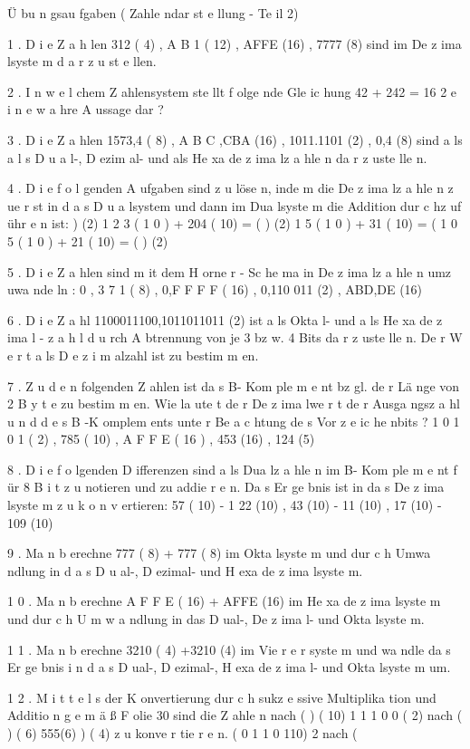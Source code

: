 Ü bu n gsau fgaben ( Zahle ndar st e llung - Te il 2)

1 . D i e Z a h len 312 ( 4) , A B 1 ( 12) , AFFE (16) , 7777 (8) sind im De z ima lsyste m
d a r z u st e llen.

2 . I n w e l chem Z ahlensystem ste llt f olge nde Gle ic hung 42 + 242 = 16 2
e i n e w a hre A ussage dar ?

3 . D i e Z a hlen 1573,4 ( 8) , A B C ,CBA (16) , 1011.1101 (2) , 0,4 (8) sind a ls
a l s D u a l-, D ezim al- und als He xa de z ima lz a hle n da r z uste lle n.

4 . D i e f o l genden A ufgaben sind z u löse n, inde m die De z ima lz a hle n z ue r st in
d a s D u a lsystem und dann im Dua lsyste m die Addition dur c hz uf ühr e n ist:
) (2)
1 2 3 ( 1 0 ) + 204 ( 10) = (
) (2)
1 5 ( 1 0 ) + 31 ( 10) = (
1 0 5 ( 1 0 ) + 21 ( 10) = (
) (2)

5 . D i e Z a hlen sind m it dem H orne r - Sc he ma in De z ima lz a hle n umz uwa nde ln :
0 , 3 7 1 ( 8) , 0,F F F F ( 16) , 0,110 011 (2) , ABD,DE (16)

6 . D i e Z a hl 1100011100,1011011011 (2) ist a ls Okta l- und a ls He xa de z ima l -
z a h l d u rch A btrennung von je 3 bz w. 4 Bits da r z uste lle n. De r W e r t a ls
D e z i m alzahl ist zu bestim m en.

7 . Z u d e n folgenden Z ahlen ist da s B- Kom ple m e nt bz gl. de r Lä nge von
2 B y t e zu bestim m en. Wie la ute t de r De z ima lwe r t de r Ausga ngsz a hl
u n d d e s B -K omplem ents unte r Be a c htung de s Vor z e ic he nbits ?
1 0 1 0 1 ( 2) , 785 ( 10) , A F F E ( 16 ) , 453 (16) , 124 (5)

8 . D i e f o lgenden D ifferenzen sind a ls Dua lz a hle n im B- Kom ple m e nt f ür
8 B i t z u notieren und zu addie r e n. Da s Er ge bnis ist in da s De z ima lsyste m
z u k o n v ertieren:
57 ( 10) - 1 22 (10) , 43 (10) - 11 (10) , 17 (10) - 109 (10)

9 . Ma n b erechne 777 ( 8) + 777 ( 8) im Okta lsyste m und dur c h Umwa ndlung in
d a s D u al-, D ezimal- und H exa de z ima lsyste m.

1 0 . Ma n b erechne A F F E ( 16) + AFFE (16) im He xa de z ima lsyste m und dur c h
U m w a ndlung in das D ual-, De z ima l- und Okta lsyste m.

1 1 . Ma n b erechne 3210 ( 4) +3210 (4) im Vie r e r syste m und wa ndle da s Er ge bnis
i n d a s D ual-, D ezimal-, H exa de z ima l- und Okta lsyste m um.

1 2 . M i t t e l s der K onvertierung dur c h sukz e ssive Multiplika tion und Additio n
g e m ä ß F olie 30 sind die Z ahle n
nach (
) ( 10)
1 1 1 0 0 ( 2)
nach (
) ( 6)
555(6)
) ( 4)
z u konve r tie r e n.
( 0 1 1 0 110) 2 nach (

